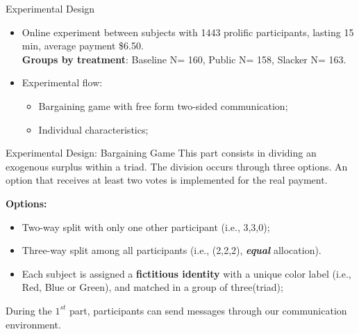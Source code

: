 \documentclass[aspectratio=169, xcolor=table]{beamer}
\begin{document}
\begin{frame}{Experimental Design}\justifying
     \begin{itemize}
     \item Online experiment between subjects with 1443  prolific participants, lasting 15 min, average payment \$6.50.\\
     \textbf{Groups by treatment}: Baseline N= 160, Public N= 158, Slacker N= 163.
     \vspace{0.5\baselineskip}  
    \item Experimental flow:
    \begin{itemize}
        \item Bargaining game with free form two-sided communication;
        \item Individual characteristics;
    \end{itemize}    
\end{itemize}
\end{frame}
\begin{frame}{Experimental Design: Bargaining Game}\justifying
    This part consists in dividing an exogenous surplus within a triad. The division occurs through three options. An option that receives at least two votes is implemented for the real payment.
    
    \vspace{0.5\baselineskip} 
    \textbf{Options:}
    \vspace{0.2\baselineskip} 
    \begin{itemize}
        \item Two-way split with only one other participant (i.e., 3,3,0);
        \item Three-way split among all participants (i.e., (2,2,2), \textbf{\textit{equal}} allocation).
        \item Each subject is assigned a \textbf{fictitious identity} with a unique color label (i.e., Red, Blue or Green), and matched in a group of three(triad);
    \end{itemize}
    \vspace{0.5\baselineskip} 
    During the \textit{$1^{st}$} part, participants can send messages through our communication environment.
\end{frame}
\end{document}
